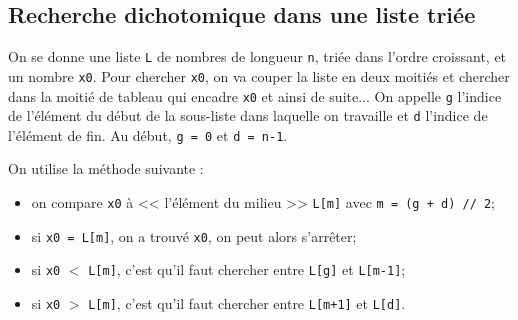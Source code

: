 %
%
%


\subsection*{Recherche dichotomique dans une liste triée}

On se donne une liste \lstinline{L} de nombres de longueur \lstinline{n}, {triée dans l'ordre croissant}, et un nombre \lstinline{x0}. 
Pour chercher \lstinline{x0}, on va couper la liste en deux moitiés et chercher dans la moitié de tableau qui encadre \lstinline{x0} et ainsi de suite...
On appelle \lstinline{g} l'indice de l'élément du début de la sous-liste dans laquelle on travaille et \lstinline{d} l'indice de l'élément de fin.
Au début, \lstinline{g = 0} et \lstinline{d = n-1}.

%

On utilise la méthode suivante :
\begin{itemize}
\item on compare \lstinline{x0} à << l'élément du milieu >>  \lstinline{L[m]} avec \lstinline{m = (g + d) // 2};
\item si \lstinline{x0 = L[m]}, on a trouvé \lstinline{x0}, on peut alors s'arrêter;
\item si \lstinline{x0} $<$ \lstinline{L[m]}, c'est qu'il faut chercher entre \lstinline{L[g]} et  \lstinline{L[m-1]};%
\item si \lstinline{x0} $>$ \lstinline{L[m]}, c'est qu'il faut chercher  entre \lstinline{L[m+1]} et \lstinline{L[d]}.%
\end{itemize}

